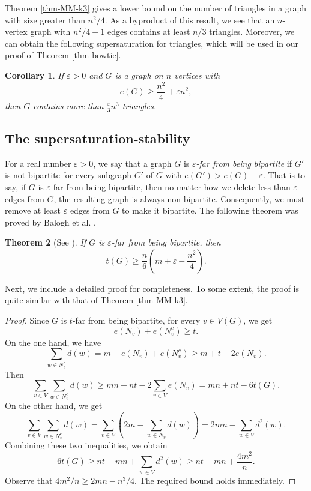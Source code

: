 \documentclass[11pt]{article}
\newtheorem{theorem}{Theorem}[section]
\newtheorem{corollary}[theorem]{Corollary}
\begin{document}
Theorem \ref{thm-MM-k3} 
gives a lower bound on the number of triangles in a graph 
with size greater than $n^2/4$.
As a byproduct of this result, 
we see that an $n$-vertex graph with $n^2/4 +1$ edges 
contains at least $n/3$ triangles. Moreover, 
we can obtain the following supersaturation for triangles, 
which will be used in our proof of Theorem \ref{thm-bowtie}. 

\begin{corollary} \label{cor-MM}
If $\varepsilon >0$ and $G$ is a graph 
on $n$ vertices with 
\[  e(G) \ge \frac{n^2}{4} + \varepsilon n^2,  \]
then $G$ contains more than $\frac{\varepsilon}{3}n^3$ triangles. 
\end{corollary}


\subsection{The supersaturation-stability}

For a real number $\varepsilon >0$, 
we say that a graph $G$ is {\it $\varepsilon$-far from being bipartite}  
if  $G'$ is not bipartite 
for every subgraph $G'$ of $G$ with 
$e(G')>  e(G) - \varepsilon$. 
That is to say, if $G$ is $\varepsilon$-far from being bipartite, 
then no matter how we delete less than $\varepsilon$ edges from $G$, 
the resulting graph is always non-bipartite. 
Consequently, we must remove at least $\varepsilon$ edges from 
$G$ to make it bipartite.  
The following theorem was proved by Balogh et al. \cite{BBCLMS2017}. 


\begin{theorem}[See \cite{BBCLMS2017}] \label{thm-far-bipartite} 
If $G$ is $\varepsilon$-far from being bipartite, then 
\[ t(G) \ge \frac{n}{6}\left( m + \varepsilon -\frac{n^2}{4}\right).  \] 
\end{theorem}  


\iffalse 
Next, we include a detailed proof for completeness. 
To some extent, the proof is quite similar with that of Theorem \ref{thm-MM-k3}. 


\begin{proof} 
Since $G$ is $t$-far from being bipartite, for every $v\in V(G)$, 
we get  
\[  e(N_v) + e(N_v^c) \ge t. \] 
On the one hand, we have 
\[  \sum_{w\in N_v^c} d(w)  = m - e(N_v) + e(N_v^c)
\ge m+t-2e(N_v).  
  \]
Then 
  \[  \sum_{v\in V} \sum_{w\in N_v^c} d(w) 
  \ge mn +nt - 2 \sum_{v\in V} e(N_v) = 
  mn +nt - 6t(G). \]
 On the other hand, we get  
\[ \sum_{v\in V} \sum_{w\in N_v^c} d(w)= 
\sum_{v\in V} \left( 2m - \sum_{w\in N_v}d(w) \right) 
= 2mn - \sum_{w\in V} d^2(w). \]
Combining these two inequalities, 
we obtain 
\[  6t(G)  
\ge nt- mn + \sum_{w\in V} d^2(w) 
\ge nt-mn + \frac{4m^2}{n}. \]
Observe that  
${4m^2}/{n} \ge 2mn - {n^3}/{4}$. 
The required bound holds immediately. 
\end{proof}
\end{document}
